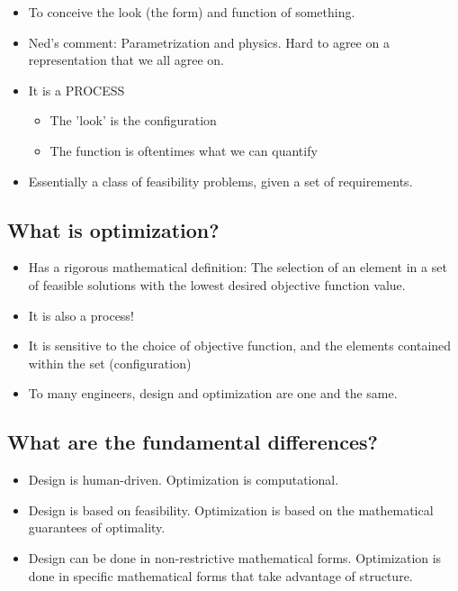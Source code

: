 \begin{itemize}
\item To conceive the look (the form) and function of something. 
\item Ned's comment: Parametrization and physics. Hard to agree on a representation that we all agree on. 
\item It is a PROCESS
\begin{itemize}
	\item The 'look' is the configuration
	\item The function is oftentimes what we can quantify
\end{itemize}
\item Essentially a class of feasibility problems, given a set of requirements. 
\end{itemize}

\subsection{What is optimization?}

\begin{itemize}
\item Has a rigorous mathematical definition: The selection of an element in a set 
of feasible solutions with the lowest desired objective function value. 
\item It is also a process!
\item It is sensitive to the choice of objective function, and the elements 
contained within the set (configuration)
\item To many engineers, design and optimization are one and the same. 
\end{itemize}

\subsection{What are the fundamental differences?}

\begin{itemize}
\item Design is human-driven. Optimization is computational. 
\item Design is based on feasibility. Optimization is based on the mathematical guarantees of optimality. 
\item Design can be done in non-restrictive mathematical forms. Optimization is done in specific mathematical forms that take advantage of structure. 
\end{itemize}

